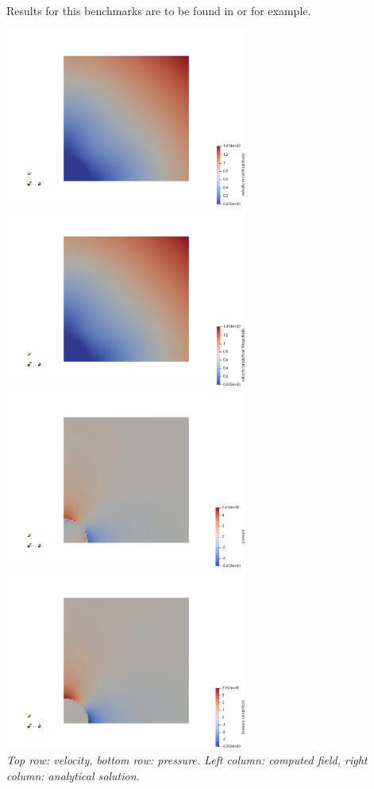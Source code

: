 \documentclass[a4paper]{article}
\begin{document}
Results for this benchmarks are to be found in \textcite{krhb12} or \textcite{gemd13} 
for example. 

\begin{center}
\includegraphics[width=8cm]{./results/benchmark_solvi/vel}
\includegraphics[width=8cm]{./results/benchmark_solvi/vel_analytical}\\
\includegraphics[width=8cm]{./results/benchmark_solvi/press}
\includegraphics[width=8cm]{./results/benchmark_solvi/press_analytical}\\
{\it Top row: velocity, bottom row: pressure. Left column: computed field, 
right column: analytical solution.}
\end{center}
\end{document}
